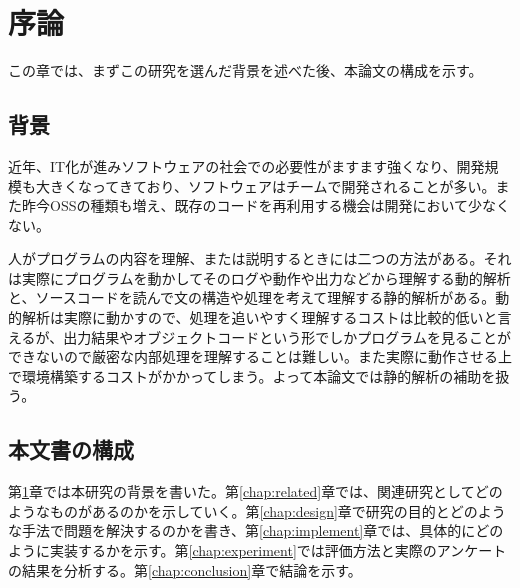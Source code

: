 \chapter{序論}
\label{chap:introduction}

この章では、まずこの研究を選んだ背景を述べた後、本論文の構成を示す。

\section{背景}

近年、IT化が進みソフトウェアの社会での必要性がますます強くなり、開発規模も大きくなってきており、ソフトウェアはチームで開発されることが多い。また昨今OSSの種類も増え、既存のコードを再利用する機会は開発において少なくない。

人がプログラムの内容を理解、または説明するときには二つの方法がある。それは実際にプログラムを動かしてそのログや動作や出力などから理解する動的解析と、ソースコードを読んで文の構造や処理を考えて理解する静的解析がある。動的解析は実際に動かすので、処理を追いやすく理解するコストは比較的低いと言えるが、出力結果やオブジェクトコードという形でしかプログラムを見ることができないので厳密な内部処理を理解することは難しい。また実際に動作させる上で環境構築するコストがかかってしまう。よって本論文では静的解析の補助を扱う。

\section{本文書の構成}

第\ref{chap:introduction}章では本研究の背景を書いた。第\ref{chap:related}章では、関連研究としてどのようなものがあるのかを示していく。第\ref{chap:design}章で研究の目的とどのような手法で問題を解決するのかを書き、第\ref{chap:implement}章では、具体的にどのように実装するかを示す。第\ref{chap:experiment}では評価方法と実際のアンケートの結果を分析する。第\ref{chap:conclusion}章で結論を示す。